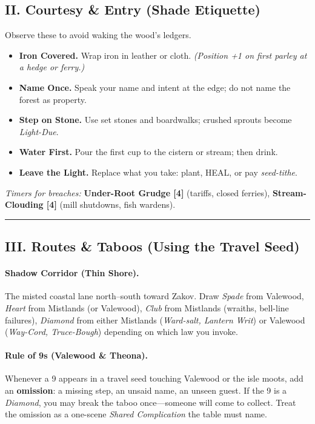 \documentclass[11pt]{article}
\begin{document}
\subsection{II. Courtesy \& Entry (Shade Etiquette)}
Observe these to avoid waking the wood's ledgers.
\begin{itemize}[leftmargin=*]
  \item \textbf{Iron Covered.} Wrap iron in leather or cloth. \emph{(Position +1 on first parley at a hedge or ferry.)}
  \item \textbf{Name Once.} Speak your name and intent at the edge; do not name the forest as property.
  \item \textbf{Step on Stone.} Use set stones and boardwalks; crushed sprouts become \emph{Light-Due}.
  \item \textbf{Water First.} Pour the first cup to the cistern or stream; then drink.
  \item \textbf{Leave the Light.} Replace what you take: plant, HEAL, or pay \emph{seed-tithe}.
\end{itemize}
\textit{Timers for breaches:} \textbf{Under-Root Grudge [4]} (tariffs, closed ferries), \textbf{Stream-Clouding [4]} (mill shutdowns, fish wardens).

\medskip\hrule\medskip

\subsection{III. Routes \& Taboos (Using the Travel Seed)}
\paragraph{Shadow Corridor (Thin Shore).} The misted coastal lane north--south toward Zakov. Draw \emph{Spade} from Valewood, \emph{Heart} from Mistlands (or Valewood), \emph{Club} from Mistlands (wraiths, bell-line failures), \emph{Diamond} from either Mistlands (\emph{Ward-salt, Lantern Writ}) or Valewood (\emph{Way-Cord, Truce-Bough}) depending on which law you invoke.

\paragraph{Rule of 9s (Valewood \& Theona).} Whenever a 9 appears in a travel seed touching Valewood or the isle moots, add an \textbf{omission}: a missing step, an unsaid name, an unseen guest. If the 9 is a \emph{Diamond}, you may break the taboo once---someone will come to collect. Treat the omission as a one-scene \emph{Shared Complication} the table must name.
\end{document}
